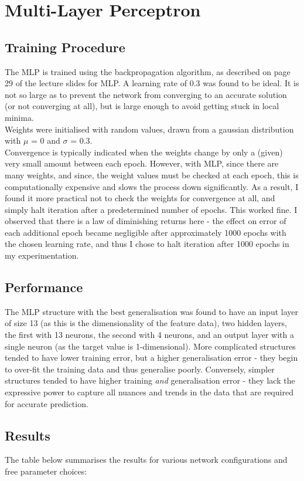 \documentclass{article}
\begin{document}
\section*{Multi-Layer Perceptron}
\subsection*{Training Procedure}
\noindent The MLP is trained using the backpropagation algorithm, as described on page 29 of the lecture slides for MLP. A learning rate of 0.3 was found to be ideal. It is not so large as to prevent the network from converging to an accurate solution (or not converging at all), but is large enough to avoid getting stuck in local minima. \\
\indent Weights were initialised with random values, drawn from a gaussian distribution with $\mu$ = 0 and $\sigma$ = 0.3. \\
\indent Convergence is typically indicated when the weights change by only a (given) very small amount between each epoch. However, with MLP, since there are many weights, and since, the weight values must be checked at each epoch, this is computationally expensive and slows the process down significantly. As a result, I found it more practical not to check the weights for convergence at all, and simply halt iteration after a predetermined number of epochs. This worked fine. I observed that there is a law of diminishing returns here - the effect on error of each additional epoch became negligible after approximately 1000 epochs with the chosen learning rate, and thus I chose to halt iteration after 1000 epochs in my experimentation.
\subsection*{Performance}
\noindent The MLP structure with the best generalisation was found to have an input layer of size 13 (as this is the dimensionality of the feature data), two hidden layers, the first with 13 neurons, the second with 4 neurons, and an output layer with a single neuron (as the target value is 1-dimensional). More complicated structures tended to have lower training error, but a higher generalisation error - they begin to over-fit the training data and thus generalise poorly. Conversely, simpler structures tended to have higher training \emph{and} generalisation error - they lack the expressive power to capture all nuances and trends in the data that are required for accurate prediction.
\subsection*{Results}
\noindent The table below summarises the results for various network configurations and free parameter choices:
\end{document}

